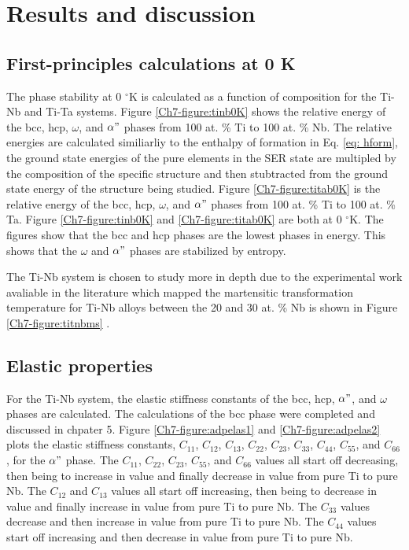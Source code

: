\section{Results and discussion}

\subsection{First-principles calculations at 0 K}

The phase stability at 0 $^\circ$K is calculated as a function of composition for the Ti-Nb and Ti-Ta systems. Figure \ref{Ch7-figure:tinb0K} shows the relative energy of the bcc, hcp, $\omega$, and $\alpha"$ phases from 100 at. \% Ti to 100 at. \% Nb. The relative energies are calculated similiarliy to the enthalpy of formation in Eq. \ref{eq: hform}, the ground state energies of the pure elements in the SER state are multipled by the composition of the specific structure and then stubtracted from the ground state energy of the structure being studied. Figure \ref{Ch7-figure:titab0K} is the relative energy of the bcc, hcp, $\omega$, and $\alpha"$ phases from 100 at. \% Ti to 100 at. \% Ta. Figure \ref{Ch7-figure:tinb0K} and \ref{Ch7-figure:titab0K} are both at 0 $^\circ$K. The figures show that the bcc and hcp phases are the lowest phases in energy. This shows that the $\omega$ and $\alpha"$ phases are stabilized by entropy.

The Ti-Nb system is chosen to study more in depth due to the experimental work avaliable in the literature which mapped the martensitic transformation temperature for Ti-Nb alloys between the 20 and 30 at. \% Nb is shown in Figure \ref{Ch7-figure:titnbms} \cite{Kim2006}.  

\subsection{Elastic properties}

For the Ti-Nb system, the elastic stiffness constants of the bcc, hcp, $\alpha"$, and $\omega$ phases are calculated. The calculations of the bcc phase were completed and discussed in chpater 5. Figure \ref{Ch7-figure:adpelas1} and \ref{Ch7-figure:adpelas2} plots the elastic stiffness constants, $C_{11}$, $C_{12}$, $C_{13}$, $C_{22}$, $C_{23}$, $C_{33}$, $C_{44}$, $C_{55}$, and $C_{66}$, for the $\alpha"$ phase. The $C_{11}$, $C_{22}$, $C_{23}$, $C_{55}$, and $C_{66}$ values all start off decreasing, then being to increase in value and finally decrease in value from pure Ti to pure Nb. The $C_{12}$ and $C_{13}$ values all start off increasing, then being to decrease in value and finally increase in value from pure Ti to pure Nb. The $C_{33}$ values decrease and then increase in value from pure Ti to pure Nb. The $C_{44}$ values start off increasing and then decrease in value from pure Ti to pure Nb. 

